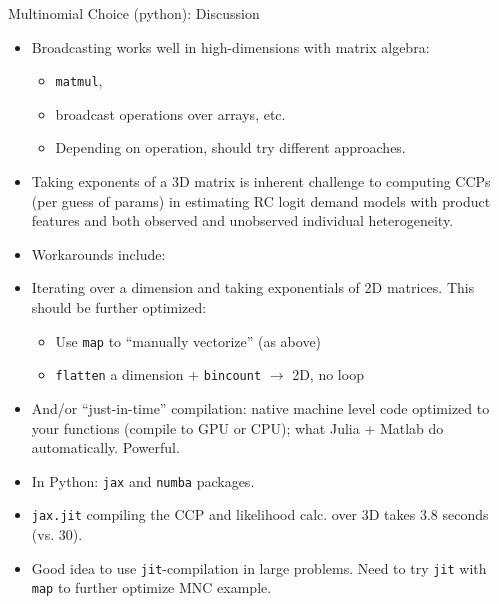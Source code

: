 \documentclass[aspectratio=1610,handout]{beamer}
\begin{document}
\begin{frame}{Multinomial Choice (python): Discussion}
\begin{itemize}
        \newpage
        \item Broadcasting works well in high-dimensions with matrix algebra:
        \begin{itemize}
            \item \verb|matmul|, 
            \item broadcast operations over arrays, etc.
            \item Depending on operation, should try different approaches.
        \end{itemize}
        \item Taking exponents of a 3D matrix is inherent challenge to computing CCPs (per guess of params) in estimating RC logit demand models with product features and both observed and unobserved individual heterogeneity. 

        \newpage
        \item Workarounds include:
        \item Iterating over a dimension and taking exponentials of 2D matrices.  This should be further optimized:
        \begin{itemize}
            \item Use \verb|map| to ``manually vectorize'' (as above)
            \item \verb|flatten| a dimension + \verb|bincount| $\rightarrow$ 2D, no loop
        \end{itemize}
        \item And/or ``just-in-time'' compilation: native machine level code optimized to your functions (compile to GPU or CPU); what Julia + Matlab do automatically.  Powerful.
        \item In Python: \verb|jax| and \verb|numba| packages.
        \item \verb|jax.jit| compiling the CCP and likelihood calc. over 3D takes 3.8 seconds (vs. 30).
        \item Good idea to use \verb|jit|-compilation in large problems. Need to try \verb|jit| with \verb|map| to further optimize MNC example.


\end{itemize}
\end{frame}
\end{document}
